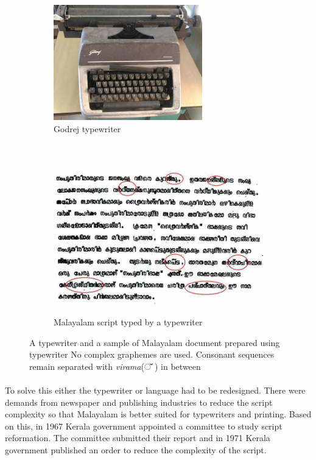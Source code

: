 \documentclass[10pt]{article}
\begin{document}
\begin{figure}[h!]
	\centering
	\begin{subfigure}{.7\textwidth}
		\centering
		\includegraphics[width=\linewidth, height=5cm]{images/godrej-typewriter.jpg}
		\caption{Godrej typewriter}
		\label{godrej}
	\end{subfigure}%
	\\
	\begin{subfigure}{\textwidth}
		\centering
		\includegraphics[width=\linewidth,height=6.5cm]{images/typewritertext4.jpg}
		\caption{Malayalam script typed by a typewriter}
		\label{typewritertext}
	\end{subfigure}
	\caption{A typewriter and a sample of Malayalam document prepared using typewriter No complex graphemes are used. Consonant sequences remain separated with \textit{virama}({\manjari ് }) in between}
	\label{typewriter}
\end{figure}

\paragraph{}
To solve this either the typewriter or language had to be redesigned. There were demands from newspaper and publishing industries to reduce the script complexity so that Malayalam is better suited for typewriters and printing. Based on this, in 1967 Kerala government appointed a committee to study script reformation. The committee submitted their report and in 1971 Kerala government published an order to reduce the complexity of the script\cite{1971go}.
\end{document}
